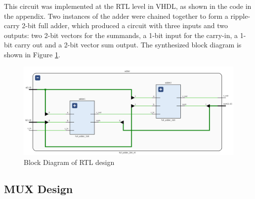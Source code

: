 \documentclass[12pt]{article}
\begin{document}
This circuit was implemented at the RTL level in VHDL, as shown in the code in the appendix.
Two instances of the adder were chained together to form a ripple-carry 2-bit full adder,
which produced a circuit with three inputs and two outputs: two 2-bit vectors for the summands,
a 1-bit input for the carry-in, a 1-bit carry out and a 2-bit vector sum output.
The synthesized block diagram is shown in Figure \ref{fig:rtl-schematic}.

\begin{figure}[h]
    \includegraphics[width=\textwidth]{rtl-schematic.png}
    \caption{Block Diagram of RTL design}
    \label{fig:rtl-schematic}
\end{figure}

\pagebreak

\subsection{MUX Design}
\end{document}

